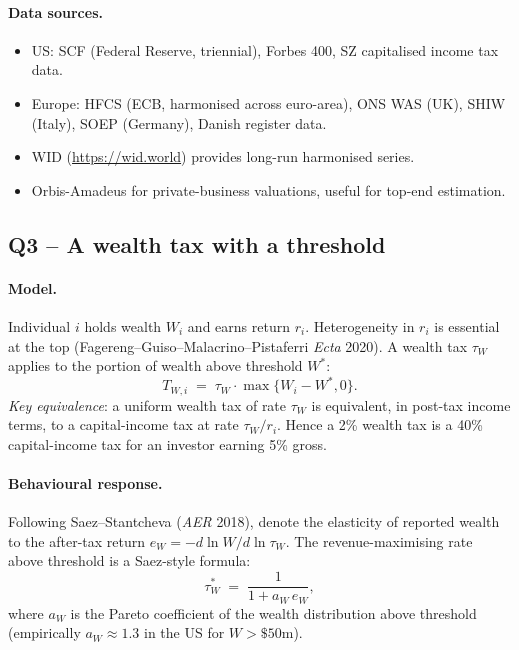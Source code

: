 \documentclass[11pt,a4paper]{article}
\begin{document}
\paragraph{Data sources.}
\begin{itemize}[leftmargin=*,itemsep=1pt]
    \item US: SCF (Federal Reserve, triennial), Forbes 400, SZ capitalised income tax data.
    \item Europe: HFCS (ECB, harmonised across euro-area), ONS WAS (UK), SHIW (Italy), SOEP (Germany), Danish register data.
    \item WID (\url{https://wid.world}) provides long-run harmonised series.
    \item Orbis-Amadeus for private-business valuations, useful for top-end estimation.
\end{itemize}

\subsection*{Q3 -- A wealth tax with a threshold}

\paragraph{Model.}
Individual $i$ holds wealth $W_{i}$ and earns return $r_{i}$. Heterogeneity in $r_{i}$ is essential at the top (Fagereng--Guiso--Malacrino--Pistaferri \emph{Ecta} 2020). A wealth tax $\tau_{W}$ applies to the portion of wealth above threshold $W^{*}$:
\[
T_{W,i}\;=\;\tau_{W}\cdot\max\{W_{i}-W^{*},0\}.
\]
\emph{Key equivalence}: a uniform wealth tax of rate $\tau_{W}$ is equivalent, in post-tax income terms, to a capital-income tax at rate $\tau_{W}/r_{i}$. Hence a 2\% wealth tax is a 40\% capital-income tax for an investor earning 5\% gross.

\paragraph{Behavioural response.}
Following Saez--Stantcheva (\emph{AER} 2018), denote the elasticity of reported wealth to the after-tax return $e_{W}=-d\ln W/d\ln\tau_{W}$. The revenue-maximising rate above threshold is a Saez-style formula:
\begin{equation}
\tau_{W}^{*}\;=\;\frac{1}{1+a_{W}\,e_{W}},
\label{eq:q6_wealth_saez}
\end{equation}
where $a_{W}$ is the Pareto coefficient of the wealth distribution above threshold (empirically $a_{W}\approx 1.3$ in the US for $W>\$50\mathrm{m}$).
\end{document}
